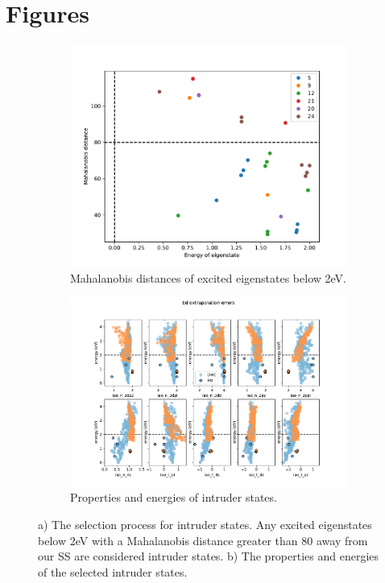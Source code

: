 \documentclass{article}
\begin{document}
\section{Figures}
\begin{figure}[H]
\centering
\begin{subfigure}{.4\textwidth}
  \centering
  \includegraphics[width=\linewidth]{../qwalk/old/ub3lyp_s1_/analysis/figs/MD.pdf}
  \caption{Mahalanobis distances of excited eigenstates below 2eV.}
  \label{fig:Intruder1}
\end{subfigure}%
\begin{subfigure}{.5\textwidth}
  \centering
  \includegraphics[width=\linewidth]{../qwalk/old/ub3lyp_s1_/analysis/figs/intruders.pdf}
  \caption{Properties and energies of intruder states.}
  \label{fig:Intruder2}
\end{subfigure}
\label{fig:Intruder}
\caption{a) The selection process for intruder states. Any excited eigenstates below 2eV with a Mahalanobis distance greater than 80 away from our SS are considered intruder states. b) The properties and energies of the selected intruder states.}
\end{figure}
\end{document}

